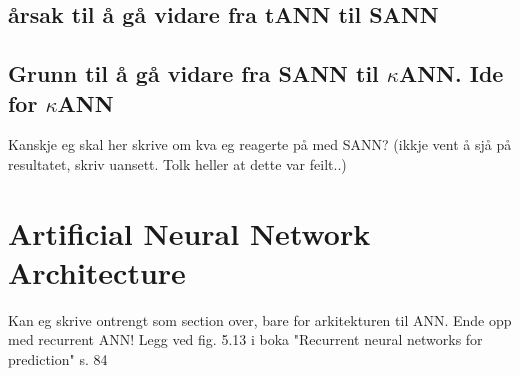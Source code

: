 	\subsection{årsak til å gå vidare fra tANN til SANN}
	\subsection{Grunn til å gå vidare fra SANN til $\kappa$ANN. Ide for $\kappa$ANN}
		Kanskje eg skal her skrive om kva eg  reagerte på med SANN? (ikkje vent å sjå på resultatet, skriv uansett. Tolk heller at dette var feilt..)

\section{Artificial Neural Network Architecture}
Kan eg skrive ontrengt som section over, bare for arkitekturen til ANN. Ende opp med recurrent ANN!
Legg ved fig. 5.13 i boka "Recurrent neural networks for prediction" s. 84






